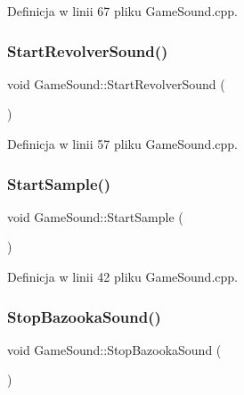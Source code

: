 Definicja w linii 67 pliku Game\+Sound.\+cpp.

\mbox{\label{class_game_sound_a909e0c0bc44437ea2853e734ab548e5a}} 
\subsubsection{\texorpdfstring{Start\+Revolver\+Sound()}{StartRevolverSound()}}
{\footnotesize\ttfamily void Game\+Sound\+::\+Start\+Revolver\+Sound (\begin{DoxyParamCaption}{ }\end{DoxyParamCaption})}



Definicja w linii 57 pliku Game\+Sound.\+cpp.

\mbox{\label{class_game_sound_a30db244babc1e4aa518bd56500cea028}} 
\subsubsection{\texorpdfstring{Start\+Sample()}{StartSample()}}
{\footnotesize\ttfamily void Game\+Sound\+::\+Start\+Sample (\begin{DoxyParamCaption}{ }\end{DoxyParamCaption})}



Definicja w linii 42 pliku Game\+Sound.\+cpp.

\mbox{\label{class_game_sound_a90742af83bd0006dba5e9a5129214c9a}} 
\subsubsection{\texorpdfstring{Stop\+Bazooka\+Sound()}{StopBazookaSound()}}
{\footnotesize\ttfamily void Game\+Sound\+::\+Stop\+Bazooka\+Sound (\begin{DoxyParamCaption}{ }\end{DoxyParamCaption})}



